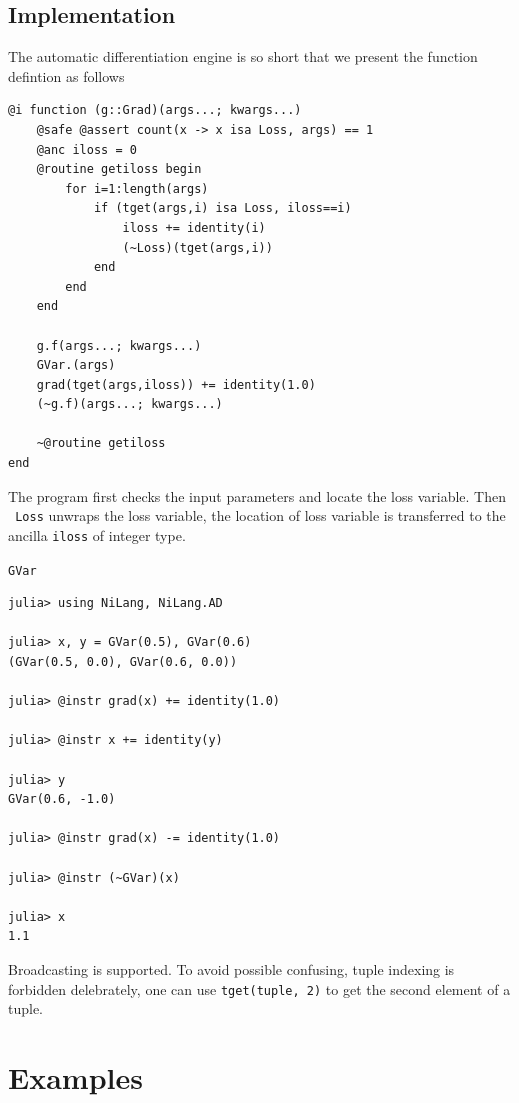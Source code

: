 \documentclass[aps,twocolumn,longbibliography,english,superscriptaddress,prr]{revtex4-1}
\newcommand{\<}{\langle}
\renewcommand{\>}{\rangle}
\theoremstyle{definition}\newtheorem{definition}{\textit{Definition}}
\begin{document}
\subsection{Implementation}
The automatic differentiation engine is so short that we present the function defintion as follows

\begin{minipage}{.44\textwidth}
\begin{lstlisting}
@i function (g::Grad)(args...; kwargs...)
    @safe @assert count(x -> x isa Loss, args) == 1
    @anc iloss = 0
    @routine getiloss begin
        for i=1:length(args)
            if (tget(args,i) isa Loss, iloss==i)
                iloss += identity(i)
                (~Loss)(tget(args,i))
            end
        end
    end

    g.f(args...; kwargs...)
    GVar.(args)
    grad(tget(args,iloss)) += identity(1.0)
    (~g.f)(args...; kwargs...)

    ~@routine getiloss
end
\end{lstlisting}
\end{minipage}

The program first checks the input parameters and locate the loss variable.
Then \texttt{~Loss} unwraps the loss variable, the location of loss variable is transferred to the ancilla \texttt{iloss} of integer type.

\texttt{GVar}

\begin{minipage}{.44\textwidth}
\begin{lstlisting}
julia> using NiLang, NiLang.AD

julia> x, y = GVar(0.5), GVar(0.6)
(GVar(0.5, 0.0), GVar(0.6, 0.0))

julia> @instr grad(x) += identity(1.0)

julia> @instr x += identity(y)

julia> y
GVar(0.6, -1.0)

julia> @instr grad(x) -= identity(1.0)

julia> @instr (~GVar)(x)

julia> x
1.1
\end{lstlisting}
\end{minipage}

Broadcasting is supported. To avoid possible confusing, tuple indexing is forbidden delebrately, one can use \texttt{tget(tuple, 2)} to get the second element of a tuple.

\section{Examples}\label{sec:example}
\end{document}
